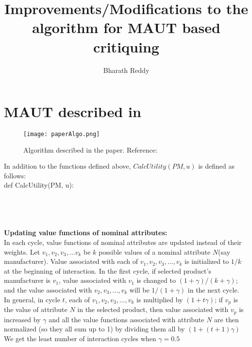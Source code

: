 \documentclass[10pt]{article}
\begin{document}
\title{Improvements/Modifications to the algorithm for MAUT based critiquing}
\author{Bharath Reddy}
\maketitle

\tableofcontents

\pagebreak
\section{MAUT described in \cite{zhang}}


\begin{figure}
    \texttt{[image: paperAlgo.png]}
  \caption{Algorithm described in the paper. Reference: \cite{zhang}}
  \centering
\label{fig:paperAlgo}
\end{figure}

In addition to the functions defined above, $CalcUtility(PM, u)$ is defined as follows:\\
def CalcUtility(PM, u):\\
\\
\noindent{}
\\
\\
\\
\textbf{Updating value functions of nominal attributes:}\\
In each cycle, value functions of nominal attributes are updated instead of their weights.
Let $v_1, v_2, v_3,\hdots v_k$ be $k$ possible values of a nominal attribute $N$(say manufacturer).
Value associated with each of $v_1, v_2, v_3,\hdots, v_k$ is initialized to $1/k$ at the beginning of interaction.
In the first cycle, if selected product's manufacturer is $v_1$, value associated with $v_1$ is changed to $(1+\gamma)/(k+\gamma)$; and the value associated with $v_2, v_3, \hdots, v_k$ will be $1/(1+\gamma)$ in the next cycle.\\
In general, in cycle $t$,  each of $v_1, v_2, v_3,\hdots, v_k$ is multiplied by $(1 + t\gamma)$; if $v_p$ is the value of attribute $N$ in the selected product, then value associated with $v_p$ is increased by $\gamma$ and all the value functions associated with attribute $N$ are then normalized (so they all sum up to 1)  by dividing them all by $(1+ (t+1)\gamma)$\\
We get the least number of interaction cycles when $\gamma = 0.5$
\end{document}
